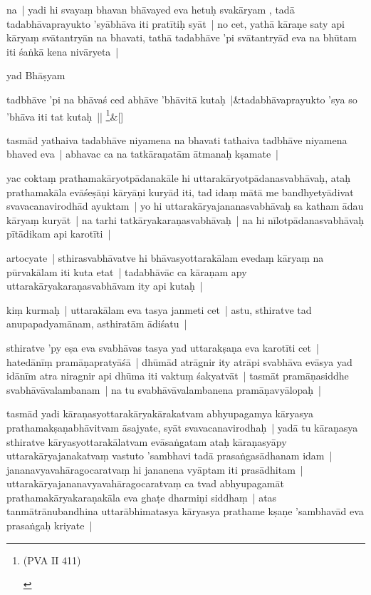 \documentclass[article,a4paper]{memoir}
\begin{document}
	  \pstart na | yadi hi svayaṃ bhavan bhā\-vayed eva hetuḥ svakā\-ryam , tadā\- tadabhā\-vaprayukto 'syā\-bhā\-va iti pratī\-tiḥ syā\-t | no cet, yathā\- kā\-raṇe saty api kā\-ryaṃ svā\-tantryā\-n na bhavati, tathā\- tadabhā\-ve 'pi svā\-tantryā\-d eva na bhū\-tam iti śaṅkā\- kena nivā\-ryeta |
	\pend
      

	  \pstart yad Bhā\-ṣyam
	\pend
      
	    
	    \stanza[\smallbreak]
tadbhā\-ve 'pi na bhā\-vaś ced abhā\-ve 'bhā\-vitā\- kutaḥ |&tadabhā\-vaprayukto 'sya so 'bhā\-va iti tat kutaḥ || \footnote{\begin{english}(PVA II 411)\end{english}}\&[\smallbreak]


	

	  \pstart tasmā\-d yathaiva tadabhā\-ve niyamena na bhavati tathaiva tadbhā\-ve niyamena bhaved eva | abhavac ca na tatkā\-raṇatā\-m ā\-tmanaḥ kṣamate |
	\pend
      

	  \pstart yac coktaṃ prathamakā\-ryotpā\-danakā\-le hi uttarakā\-ryotpā\-danasvabhā\-vaḥ, ataḥ prathamakā\-la evā\-śeṣā\-ṇi kā\-ryā\-ṇi kuryā\-d iti, tad idaṃ mā\-tā\- me bandhyetyā\-divat svavacanavirodhā\-d ayuktam | yo hi uttarakā\-ryajananasvabhā\-vaḥ sa katham ā\-dau kā\-ryaṃ kuryā\-t | na tarhi tatkā\-ryakaraṇasvabhā\-vaḥ | na hi nī\-lotpā\-danasvabhā\-vaḥ pī\-tā\-dikam api karotī\-ti |
	\pend
      

	  \pstart artocyate | sthirasvabhā\-vatve hi bhā\-vasyottarakā\-lam evedaṃ kā\-ryaṃ na pū\-rvakā\-lam iti kuta etat | tadabhā\-vā\-c ca kā\-raṇam apy uttarakā\-ryakaraṇasvabhā\-vam ity api kutaḥ | 
	\pend
      

	  \pstart kiṃ kurmaḥ | uttarakā\-lam eva tasya janmeti cet | astu, sthiratve tad anupapadyamā\-nam, asthiratā\-m ā\-diśatu |
	\pend
      

	  \pstart sthiratve 'py eṣa eva svabhā\-vas tasya yad uttarakṣaṇa eva karotī\-ti cet | hatedā\-nī\-ṃ pramā\-ṇapratyā\-śā\- | dhū\-mā\-d atrā\-gnir ity atrā\-pi svabhā\-va evā\-sya yad idā\-nī\-m atra niragnir api dhū\-ma iti vaktuṃ śakyatvā\-t | tasmā\-t pramā\-ṇasiddhe svabhā\-vā\-valambanam | na tu svabhā\-vā\-valambanena pramā\-ṇavyā\-lopaḥ | 
	\pend
      

	  \pstart tasmā\-d yadi kā\-raṇasyottarakā\-ryakā\-rakatvam abhyupagamya kā\-ryasya prathamakṣaṇabhā\-vitvam ā\-sajyate, syā\-t svavacanavirodhaḥ | yadā\- tu kā\-raṇasya sthiratve kā\-ryasyottarakā\-latvam evā\-saṅgatam ataḥ kā\-raṇasyā\-py uttarakā\-ryajanakatvaṃ vastuto 'sambhavi tadā\- prasaṅgasā\-dhanam idam | jananavyavahā\-ragocaratvaṃ hi jananena vyā\-ptam iti prasā\-dhitam | uttarakā\-ryajananavyavahā\-ragocaratvaṃ ca tvad abhyupagamā\-t prathamakā\-ryakaraṇakā\-la eva ghaṭe dharmiṇi siddhaṃ | atas tanmā\-trā\-nubandhina uttarā\-bhimatasya kā\-ryasya prathame kṣaṇe 'sambhavā\-d eva prasaṅgaḥ kriyate | 
	\pend
      
\end{document}
